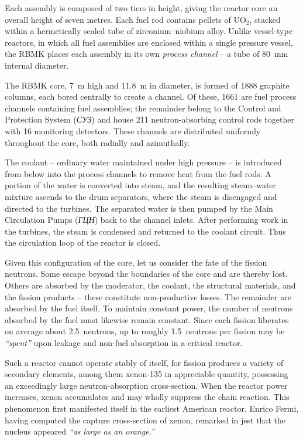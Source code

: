 \documentclass[openright]{bookest}
\begin{document}
Each assembly is composed of two tiers in height, giving the reactor core an overall height of seven metres. Each fuel rod contains pellets of $\mathrm{UO_2}$, stacked within a hermetically sealed tube of zirconium--niobium alloy. Unlike vessel-type reactors, in which all fuel assemblies are enclosed within a single pressure vessel, the RBMK places each assembly in its own \textit{process channel} -- a tube of \qty{80}{\milli\metre} internal diameter.

The RBMK core, \qty{7}{\metre} high and \qty{11.8}{\metre} in diameter, is formed of \num{1888} graphite columns, each bored centrally to create a channel. Of these, \num{1661} are fuel process channels containing fuel assemblies; the remainder belong to the Control and Protection System (\textit{СУЗ}) and house \num{211} neutron-absorbing control rods together with \num{16} monitoring detectors. These channels are distributed uniformly throughout the core, both radially and azimuthally.

The coolant -- ordinary water maintained under high pressure -- is introduced from below into the process channels to remove heat from the fuel rods. A portion of the water is converted into steam, and the resulting steam--water mixture ascends to the drum separators, where the steam is disengaged and directed to the turbines. The separated water is then pumped by the Main Circulation Pumps (\textit{ГЦН}) back to the channel inlets. After performing work in the turbines, the steam is condensed and returned to the coolant circuit. Thus the circulation loop of the reactor is closed.

Given this configuration of the core, let us consider the fate of the fission neutrons. Some escape beyond the boundaries of the core and are thereby lost. Others are absorbed by the moderator, the coolant, the structural materials, and the fission products -- these constitute non-productive losses. The remainder are absorbed by the fuel itself. To maintain constant power, the number of neutrons absorbed by the fuel must likewise remain constant. Since each fission liberates on average about \num{2.5}~neutrons, up to roughly \num{1.5}~neutrons per fission may be \textit{``spent''} upon leakage and non-fuel absorption in a critical reactor.

Such a reactor cannot operate stably of itself, for fission produces a variety of secondary elements, among them xenon-135 in appreciable quantity, possessing an exceedingly large neutron-absorption cross-section. When the reactor power increases, xenon accumulates and may wholly suppress the chain reaction. This phenomenon first manifested itself in the earliest American reactor. Enrico Fermi, having computed the capture cross-section of xenon, remarked in jest that the nucleus appeared \textit{``as large as an orange.''}
\end{document}
